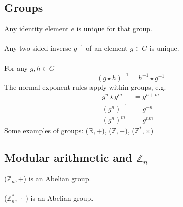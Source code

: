 \documentclass{article}
\newcommand{\R}{\mathbb{R}}
\newcommand{\Z}{\mathbb{Z}}
\begin{document}
\subsection{Groups}
Any identity element $ e $ is unique for that group.
\\\\
Any two-sided inverse $ g^{-1} $ of an element $ g \in G $ is unique.
\\\\
For any $g, h \in G $
\begin{equation}
(g \star h)^{-1} = h^{-1} \star g^{-1}
\end{equation}
The normal exponent rules apply within groups, e.g.
\begin{align}
g^{n} \star g^{m} & = g^{n+m} \\
(g^{n})^{-1} & = g^{-n} \\
(g^{n})^{m} & = g^{nm}
\end{align}
Some examples of groups:
($ \R, + $), ($ \Z, + $), ($ \Z^{*}, \times $)


\subsection{Modular arithmetic and $ \Z_{n} $}
($ \Z_{n}, + $) is an Abelian group.
\\\\
($ \Z_{n}^{*}, \ \cdot \ $) is an Abelian group.
\end{document}
